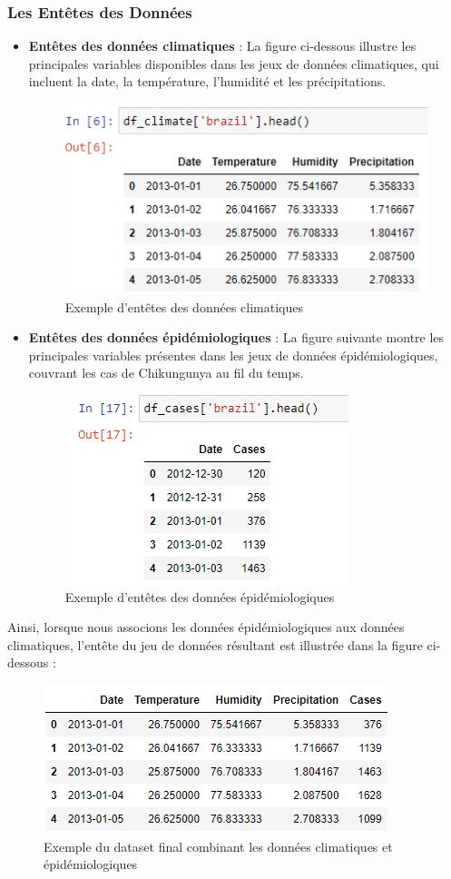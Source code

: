 \subsubsection*{Les Entêtes des Données}
\begin{itemize}
	\item \textbf{Entêtes des données climatiques} : La figure ci-dessous illustre les principales variables disponibles dans les jeux de données climatiques, qui incluent la date, la température, l'humidité et les précipitations.
	\begin{figure}[h!]
		\centering
		\includegraphics[width=0.5\linewidth]{images/climate_dataset_sample}
		\caption[Exemple d'entêtes des données climatiques]{Exemple d'entêtes des données climatiques}
		\label{fig:climatedatasetsample}
	\end{figure}
	
	\item \textbf{Entêtes des données épidémiologiques} : La figure suivante montre les principales variables présentes dans les jeux de données épidémiologiques, couvrant les cas de Chikungunya au fil du temps.
	\begin{figure}[h!]
		\centering
		\includegraphics[width=0.5\linewidth]{images/cases_dataset_sample}
		\caption[Exemple d'entêtes des données épidémiologiques]{Exemple d'entêtes des données épidémiologiques}
		\label{fig:casesdatasetsample}
	\end{figure}
\end{itemize}

Ainsi, lorsque nous associons les données épidémiologiques aux données climatiques, l'entête du jeu de données résultant est illustrée dans la figure ci-dessous :
\begin{figure}[h!]
	\centering
	\includegraphics[width=0.7\linewidth]{images/dataset_sample}
	\caption{Exemple du dataset final combinant les données climatiques et épidémiologiques}
	\label{fig:datasetsample}
\end{figure}

